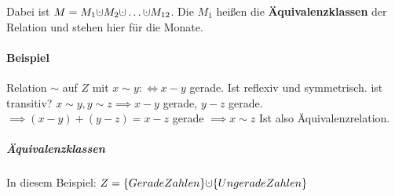\documentclass[14pt,a4paper]{article}
\newcommand{\dotcup}{\ensuremath{\mathaccent\cdot\cup}}
\begin{document}
				Dabei ist $ M = M_1 \dotcup M_2 \dotcup \dots \dotcup M_{12} $. Die $M_1$ heißen die \textbf{Äquivalenzklassen} der Relation und stehen hier für die Monate.

			\paragraph{Beispiel}
				Relation $ \sim $ auf $ Z $ mit $ x \sim y :\Leftrightarrow x-y $ gerade.
				Ist reflexiv und symmetrisch.
				ist transitiv? $ x \sim y, y \sim z \implies x-y$ gerade, $ y-z$ gerade. $\implies (x-y) + (y-z) = x-z$ gerade $\implies x \sim z $
				Ist also Äquivalenzrelation.

				\subparagraph{Äquivalenzklassen}
					In diesem Beispiel: $ Z = \{Gerade Zahlen\} \dotcup \{Ungerade Zahlen\} $
\end{document}
